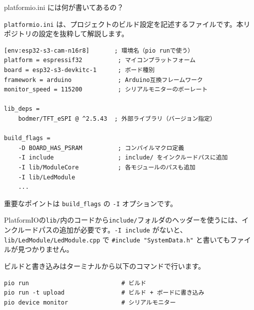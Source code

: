 \begin{qabox}{platformio.ini には何が書いてあるの？}

\texttt{platformio.ini} は、プロジェクトのビルド設定を記述するファイルです。本リポジトリの設定を抜粋して解説します。

\begin{lstlisting}[language={},keywordstyle={},commentstyle=\color{gray}\itshape,morecomment={[l]{;}}]
[env:esp32-s3-cam-n16r8]       ; 環境名（pio runで使う）
platform = espressif32          ; マイコンプラットフォーム
board = esp32-s3-devkitc-1      ; ボード種別
framework = arduino             ; Arduino互換フレームワーク
monitor_speed = 115200          ; シリアルモニターのボーレート

lib_deps =
    bodmer/TFT_eSPI @ ^2.5.43  ; 外部ライブラリ（バージョン指定）

build_flags =
    -D BOARD_HAS_PSRAM          ; コンパイルマクロ定義
    -I include                  ; include/ をインクルードパスに追加
    -I lib/ModuleCore           ; 各モジュールのパスも追加
    -I lib/LedModule
    ...
\end{lstlisting}

重要なポイントは \texttt{build\_flags} の \texttt{-I} オプションです。

\begin{notebox}[なぜ -I でパスを追加するの？]
PlatformIOの\texttt{lib/}内のコードから\texttt{include/}フォルダのヘッダーを使うには、インクルードパスの追加が必要です。\texttt{-I include} がないと、\texttt{lib/LedModule/LedModule.cpp} で \texttt{\#include "SystemData.h"} と書いてもファイルが見つかりません。
\end{notebox}

ビルドと書き込みはターミナルから以下のコマンドで行います。

\begin{lstlisting}[language={},keywordstyle={},commentstyle={},stringstyle={},numbers=none]
pio run                          # ビルド
pio run -t upload                # ビルド + ボードに書き込み
pio device monitor               # シリアルモニター
\end{lstlisting}

\end{qabox}

